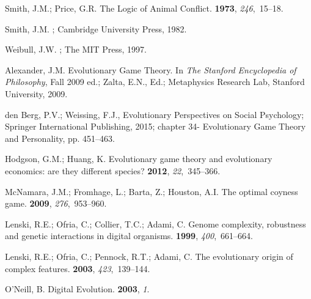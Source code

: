\documentclass[journal,article,accept,oneauthor,pdftex,10pt,a4paper,games]{mdpi}
\begin{document}
%
\begin{thebibliography}{999}
\providecommand{\natexlab}[1]{#1}

Smith, J.M.; Price, G.R.
\newblock The Logic of Animal Conflict.
 {\bf 1973}, {\em 246},~15--18.

Smith, J.M.
; Cambridge University Press,
  1982.

Weibull, J.W.
; The MIT Press,  1997.

Alexander, J.M.
\newblock Evolutionary Game Theory. In {\em The Stanford Encyclopedia of
  Philosophy}, Fall 2009 ed.;  Zalta, E.N., Ed.; Metaphysics Research Lab,
  Stanford University,  2009.

den Berg, P.V.; Weissing, F.J., Evolutionary Perspectives on Social Psychology;
  Springer International Publishing,  2015; chapter 34- Evolutionary Game
  Theory and Personality, pp. 451--463.

Hodgson, G.M.; Huang, K.
\newblock Evolutionary game theory and evolutionary economics: are they
  different species?
 {\bf 2012}, {\em
  22},~345--366.

McNamara, J.M.; Fromhage, L.; Barta, Z.; Houston, A.I.
\newblock The optimal coyness game.
 {\bf 2009}, {\em 276},~953--960.

Lenski, R.E.; Ofria, C.; Collier, T.C.; Adami, C.
\newblock Genome complexity, robustness and genetic interactions in digital
  organisms.
 {\bf 1999}, {\em 400},~661--664.

Lenski, R.E.; Ofria, C.; Pennock, R.T.; Adami, C.
\newblock The evolutionary origin of complex features.
 {\bf 2003}, {\em 423},~139--144.

O'Neill, B.
\newblock Digital Evolution.
 {\bf 2003}, {\em 1}.


\end{thebibliography}
\end{document}
